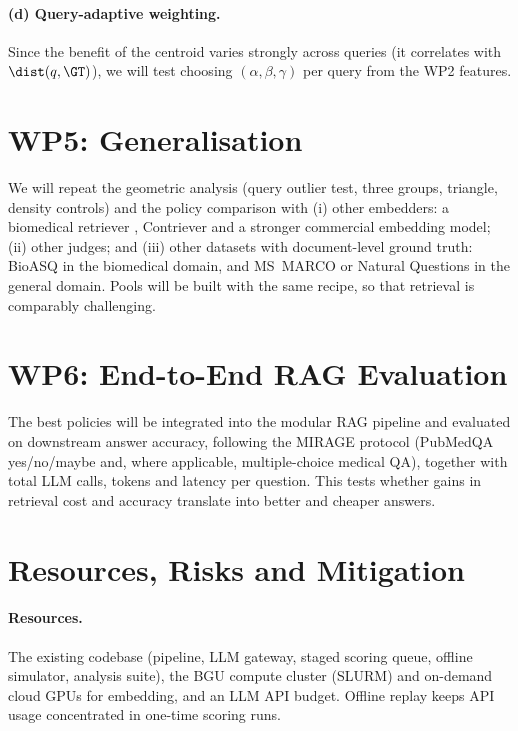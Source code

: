 \paragraph{(d) Query-adaptive weighting.}
Since the benefit of the centroid varies strongly across queries (it correlates with $\dist(q,\GT)$), we will test choosing $(\alpha,\beta,\gamma)$ per query from the WP2 features.

\section{WP5: Generalisation}

We will repeat the geometric analysis (query outlier test, three groups, triangle, density controls) and the policy comparison with (i) other embedders: a biomedical retriever \citep{jin2023medcpt}, Contriever \citep{izacard2022contriever} and a stronger commercial embedding model; (ii) other judges; and (iii) other datasets with document-level ground truth: BioASQ \citep{tsatsaronis2015bioasq} in the biomedical domain, and MS~MARCO \citep{nguyen2016msmarco} or Natural Questions \citep{kwiatkowski2019nq} in the general domain. Pools will be built with the same recipe, so that retrieval is comparably challenging.

\section{WP6: End-to-End RAG Evaluation}

The best policies will be integrated into the modular RAG pipeline and evaluated on downstream answer accuracy, following the MIRAGE protocol \citep{xiong2024medrag} (PubMedQA yes/no/maybe and, where applicable, multiple-choice medical QA), together with total LLM calls, tokens and latency per question. This tests whether gains in retrieval cost and accuracy translate into better and cheaper answers.

\section{Resources, Risks and Mitigation}

\paragraph{Resources.}
The existing codebase (pipeline, LLM gateway, staged scoring queue, offline simulator, analysis suite), the BGU compute cluster (SLURM) and on-demand cloud GPUs for embedding, and an LLM API budget. Offline replay keeps API usage concentrated in one-time scoring runs.

